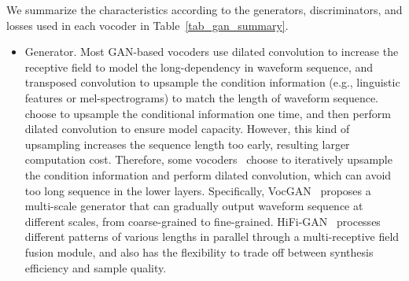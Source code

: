 \documentclass{article}
\begin{document}
We summarize the characteristics according to the generators, discriminators, and losses used in each vocoder in Table~\ref{tab_gan_summary}.
\begin{itemize}[leftmargin=*]
\item Generator. Most GAN-based vocoders use dilated convolution to increase the receptive field to model the long-dependency in waveform sequence, and transposed convolution to upsample the condition information (e.g., linguistic features or mel-spectrograms) to match the length of waveform sequence. \citet{yamamoto2020parallel} choose to upsample the conditional information one time, and then perform dilated convolution to ensure model capacity. However, this kind of upsampling increases the sequence length too early, resulting larger computation cost. Therefore, some vocoders~\cite{kumar2019melgan,kong2020hifi} choose to iteratively upsample the condition information and perform dilated convolution, which can avoid too long sequence in the lower layers. Specifically, VocGAN~\cite{yang2020vocgan} proposes a multi-scale generator that can gradually output waveform sequence at different scales, from coarse-grained to fine-grained. HiFi-GAN~\cite{kong2020hifi} processes different patterns of various lengths in parallel through a multi-receptive field fusion module, and also has the flexibility to trade off between synthesis efficiency and sample quality.


\end{itemize}
\end{document}
